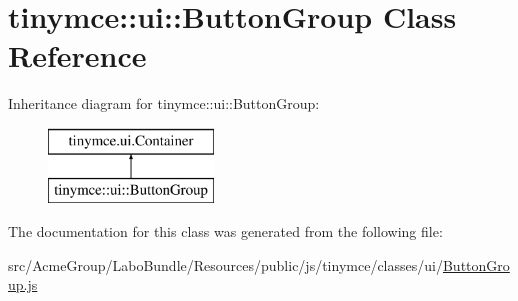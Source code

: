 \hypertarget{classtinymce_1_1ui_1_1_button_group}{\section{tinymce\+:\+:ui\+:\+:Button\+Group Class Reference}
\label{classtinymce_1_1ui_1_1_button_group}
}
Inheritance diagram for tinymce\+:\+:ui\+:\+:Button\+Group\+:\begin{figure}[H]
\begin{center}
\leavevmode
\includegraphics[height=2.000000cm]{classtinymce_1_1ui_1_1_button_group}
\end{center}
\end{figure}


The documentation for this class was generated from the following file\+:\begin{DoxyCompactItemize}
\item 
src/\+Acme\+Group/\+Labo\+Bundle/\+Resources/public/js/tinymce/classes/ui/\hyperlink{_button_group_8js}{Button\+Group.\+js}\end{DoxyCompactItemize}
